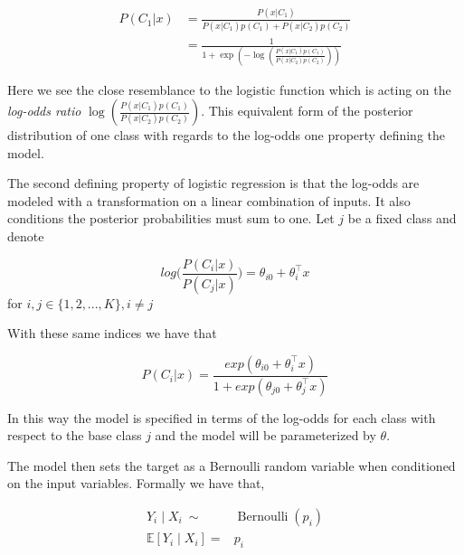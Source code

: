 \begin{equation}
\begin{split}
P(C_1| x) & = \frac{P(x|C_1) }{P(x|C_1)p(C_1) + P(x|C_2)p(C_2)} \\
& = \frac{1 }
{1 + \exp(- \log( \frac{ P(x|C_1)p(C_1)}
{P(x|C_2)p(C_2)
}))
}
\end{split}
\end{equation}

Here we see the close resemblance to the logistic function which is acting on the \textit{log-odds ratio} $ \log( \frac{ P(x|C_1)p(C_1)}{P(x|C_2)p(C_2) })$. This equivalent form of the posterior distribution of one class with regards to the log-odds one property defining the model.



The second defining property of logistic regression is that the log-odds are modeled with a transformation on a linear combination of inputs. It also conditions the posterior probabilities must sum to one. Let $j$ be a fixed class and denote

\begin{equation}
 log\big( \frac{P(C_i|x)}{P(C_j|x)}\big) = \theta_{i0}  + \theta_i^\intercal x  
 \end{equation}  \label{logit-logOddss} for $i,j \in \{1,2,...,K\}, i\neq j$

With these same indices we have that

\begin{equation} P(C_i|x) = \frac{ exp(\theta_{i0}  + \theta_i^\intercal x)}{1 + exp(\theta_{j0}  + \theta_j^\intercal x)} 
\end{equation}

In this way the model is specified in terms of the log-odds for each class with respect to the base class $j$ and the model will be parameterized by $\theta$.

The model then sets the target as a Bernoulli random variable when conditioned on the input variables. Formally we have that,

\begin{equation}
\begin{split}
Y_i \mid X_i \  \sim & \operatorname{Bernoulli}(p_i) \\
\mathbb{E}[Y_i \mid X_i ] = & p_i
\end{split}
\end{equation}


